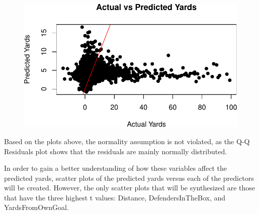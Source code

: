 \documentclass[
  super,
  preprint,
  3p]{elsarticle}
\newenvironment{Shaded}{\begin{snugshade}}{\end{snugshade}}
\newcommand{\AttributeTok}[1]{\textcolor[rgb]{0.40,0.45,0.13}{#1}}
\newcommand{\CommentTok}[1]{\textcolor[rgb]{0.37,0.37,0.37}{#1}}
\newcommand{\DecValTok}[1]{\textcolor[rgb]{0.68,0.00,0.00}{#1}}
\newcommand{\FunctionTok}[1]{\textcolor[rgb]{0.28,0.35,0.67}{#1}}
\newcommand{\NormalTok}[1]{\textcolor[rgb]{0.00,0.23,0.31}{#1}}
\newcommand{\OtherTok}[1]{\textcolor[rgb]{0.00,0.23,0.31}{#1}}
\newcommand{\SpecialCharTok}[1]{\textcolor[rgb]{0.37,0.37,0.37}{#1}}
\newcommand{\StringTok}[1]{\textcolor[rgb]{0.13,0.47,0.30}{#1}}
\begin{document}
\begin{figure}[H]

{\centering \includegraphics{project_report_files/figure-pdf/unnamed-chunk-10-1.pdf}

}

\end{figure}

Based on the plots above, the normality assumption is not violated, as
the Q-Q Residuals plot shows that the residuals are mainly normally
distributed.

In order to gain a better understanding of how these variables affect
the predicted yards, scatter plots of the predicted yards versus each of
the predictors will be created. However, the only scatter plots that
will be synthesized are those that have the three highest t values:
Distance, DefendersInTheBox, and YardsFromOwnGoal.

\begin{Shaded}
\end{Shaded}

\begin{Shaded}
\end{Shaded}
\end{document}
